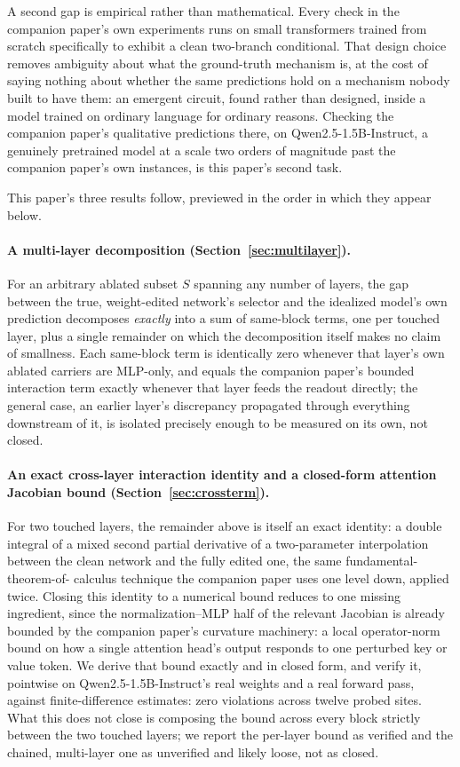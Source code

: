 \documentclass[11pt,a4paper]{article}
\begin{document}
A second gap is empirical rather than mathematical. Every check in the
companion paper's own experiments runs on small transformers trained from
scratch specifically to exhibit a clean two-branch conditional. That design
choice removes ambiguity about what the ground-truth mechanism is, at the
cost of saying nothing about whether the same predictions hold on a
mechanism nobody built to have them: an emergent circuit, found rather than
designed, inside a model trained on ordinary language for ordinary reasons.
Checking the companion paper's qualitative predictions there, on
Qwen2.5-1.5B-Instruct, a genuinely pretrained model at a scale two orders of
magnitude past the companion paper's own instances, is this paper's second
task.

This paper's three results follow, previewed in the order in which they
appear below.

\paragraph{A multi-layer decomposition (Section~\ref{sec:multilayer}).} For
an arbitrary ablated subset $S$ spanning any number of layers, the gap
between the true, weight-edited network's selector and the idealized model's
own prediction decomposes \emph{exactly} into a sum of same-block terms, one
per touched layer, plus a single remainder on which the decomposition itself
makes no claim of smallness. Each same-block term is identically zero
whenever that layer's own ablated carriers are MLP-only, and equals the
companion paper's bounded interaction term exactly whenever that layer feeds
the readout directly; the general case, an earlier layer's discrepancy
propagated through everything downstream of it, is isolated precisely enough
to be measured on its own, not closed.

\paragraph{An exact cross-layer interaction identity and a closed-form
attention Jacobian bound (Section~\ref{sec:crossterm}).} For two touched
layers, the remainder above is itself an exact identity: a double integral
of a mixed second partial derivative of a two-parameter interpolation between
the clean network and the fully edited one, the same fundamental-theorem-of-
calculus technique the companion paper uses one level down, applied twice.
Closing this identity to a numerical bound reduces to one missing ingredient,
since the normalization--MLP half of the relevant Jacobian is already bounded
by the companion paper's curvature machinery: a local operator-norm bound on
how a single attention head's output responds to one perturbed key or value
token. We derive that bound exactly and in closed form, and verify it,
pointwise on Qwen2.5-1.5B-Instruct's real weights and a real forward pass,
against finite-difference estimates: zero violations across twelve probed
sites. What this does not close is composing the bound across every block
strictly between the two touched layers; we report the per-layer bound as
verified and the chained, multi-layer one as unverified and likely loose, not
as closed.
\end{document}
